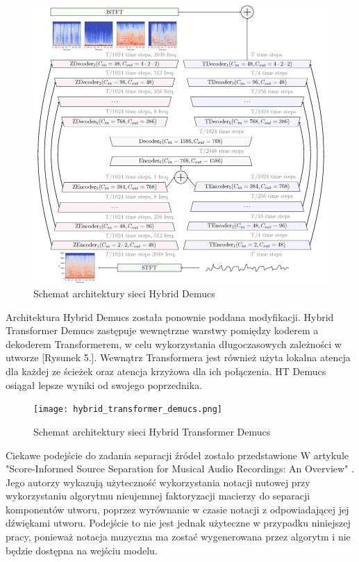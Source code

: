\documentclass{article}
\begin{document}
\begin{figure}[h!]
\centering
\includegraphics[width=0.75\linewidth]{hybrid_demucs.png}
\caption{\label{fig:unet}Schemat architektury sieci Hybrid Demucs}
\end{figure}


Architektura Hybrid Demucs została ponownie poddana modyfikacji. Hybrid Transformer Demucs \cite{rouard2022hybrid} zastępuje wewnętrzne warstwy pomiędzy koderem a dekoderem Transformerem, w celu wykorzystania długoczasowych zależności w utworze [Rysunek 5.]. Wewnątrz Transformera jest również użyta lokalna atencja dla każdej ze ścieżek oraz atencja krzyżowa dla ich połączenia. HT Demucs osiągał lepsze wyniki od swojego poprzednika. \\

\begin{figure}[h!]
\centering
\texttt{[image: hybrid\_transformer\_demucs.png]}
\caption{\label{fig:unet}Schemat architektury sieci Hybrid Transformer Demucs}
\end{figure}


Ciekawe podejście do zadania separacji źródeł zostało przedstawione W artykule "Score-Informed Source Separation for Musical Audio Recordings: An Overview" \cite{score-informed}. Jego autorzy wykazują użyteczność wykorzystania notacji nutowej przy wykorzystaniu algorytmu nieujemnej faktoryzacji macierzy do separacji komponentów utworu, poprzez wyrównanie w czasie notacji z odpowiadającej jej dźwiękami utworu. Podejście to nie jest jednak użyteczne w przypadku niniejszej pracy, ponieważ notacja muzyczna ma zostać wygenerowana przez algorytm i nie będzie dostępna na wejściu modelu. \\
\end{document}
